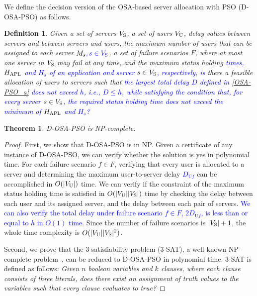 \documentclass[10pt, letterpaper]{IEEEtran}
\newtheorem{thm}{Theorem} %
\newtheorem{definition}{Definition}
\newcommand\blue[1]{\textcolor{blue}{#1}}
\begin{document}
\begin{CJK}{UTF8}{ipxm}
We define the decision version of the OSA-based server allocation with PSO (D-OSA-PSO) as follows.
\begin{definition}
    Given a set of servers $V_{\rm{S}}$, a set of users $V_{\rm{U}}$, delay values between servers and between servers and users, the maximum number of users that can be assigned to each server $M_s\blue{, s \in V_{\rm{S}}}$, a set of failure scenarios $F$, where at most one server in $V_{\rm{S}}$ may fail at any time, 
    and the maximum status holding \blue{times, $H_{\rm APL}$ and $H_s$ of an application and server $s \in V_{\rm{S}}$, respectively, 
    is} there a feasible allocation of users to servers such that \blue{the largest total delay $D$ defined in \eqref{OSA-PSO_a} does not exceed $h$, i.e., $D \leq h$, while satisfying the condition that, for every server $s \in V_{\rm{S}}$, the required status holding time does not exceed the minimum of $H_{\rm APL}$ and $H_s$?}
\end{definition}
\begin{thm}
D-OSA-PSO is NP-complete.
\end{thm}
\begin{proof}
  First, we show that D-OSA-PSO is in NP.
  Given a certificate of any instance of D-OSA-PSO, we can verify whether the solution is yes in polynomial time.  %
  For each failure scenario $f \in F$, verifying that every user is allocated to a server and determining the maximum user-to-server delay \blue{$D_{\mathrm{U}f}$} can be accomplished in $O(|V_{\rm{U}}|)$ time.
  We can verify if the constraint of the maximum status holding time is satisfied in $O(|V_{\rm{U}}||V_{\rm{S}}|)$ time by checking the delay between each user and its assigned server, and the delay between each pair of servers.
  \blue{We can also verify the total delay under failure scenario $f \in F$, $2D_{\mathrm{U}f}$, is less than or equal to $h$ in $O(1)$ time.}
  Since the number of failure scenarios is $|V_{\rm{S}}|+1$, the whole time complexity is $O(|V_{\rm{U}}||V_{\rm{S}}|^2)$.

  Second, we prove that the 3-satisfiability problem (3-SAT), a well-known NP-complete problem~\cite{3_12_3SAT}, can be reduced to D-OSA-PSO in polynomial time. 
  3-SAT is defined as follows:
  {\it Given $n$ boolean variables and $k$ clauses, where each clause consists of three literals, does there exist an assignment of truth values to the variables such that every clause evaluates to true?}


\end{proof}
\end{CJK}
\end{document}
